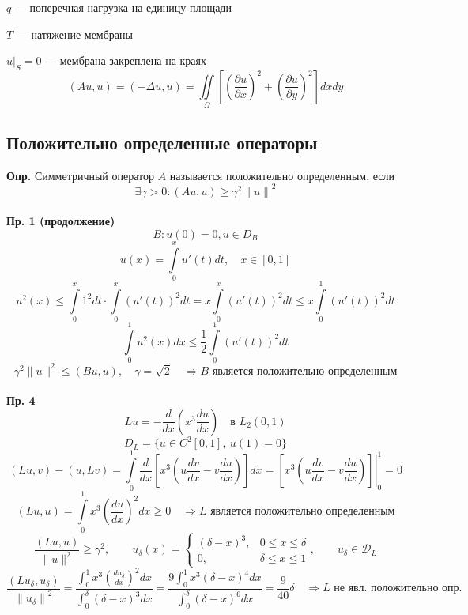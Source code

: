 \documentclass[12pt, a4paper]{article}
\begin{document}
$q$ --- поперечная нагрузка на единицу площади

$T$ --- натяжение мембраны

$ {u|}_S = 0 $ --- мембрана закреплена на краях
\[ (A u , u) = (- \Delta u , u) = \iint\limits_{\Omega} \left[ \left(\frac{\partial u }{\partial x }\right)^2 + \left(\frac{ \partial u }{\partial y }\right)^2 \right] dx dy  \]

\subsection{Положительно определенные операторы}

\textbf{Опр.} Симметричный оператор $A$ называется положительно определенным, если
\begin{equation}
	\exists \gamma > 0 : (Au, u) \geq \gamma^2 {\|u\|}^2
\end{equation} \\
\textbf{Пр. 1 (продолжение)}
\[ B: u(0) = 0, u \in D_B \]
\[ u(x) = \int\limits_{0}^{x } u'(t) dt, \quad x \in [0, 1] \]
\[ u^2(x) \leq \int\limits_{0}^{x} 1^2 dt \cdot \int\limits_{0}^{x} {(u'(t))}^2 dt = x \int\limits_{0}^{x} {(u'(t))}^2 dt \leq x \int\limits_{0}^{1} {(u'(t))}^2 dt \]
\[ \int\limits_{0}^{1} u^2 (x) dx \leq \frac{1}{2} \int\limits_{0}^{1} {(u'(t))}^2 dt \]
\[ \gamma^2 \|u\|^2 \leq (Bu, u) , \quad \gamma = \sqrt{2} \quad \Rightarrow B \text{ является положительно определенным} \] \\
\textbf{Пр. 4}
\[ Lu = - \frac{d }{ d x } \left(x^3 \frac{du}{dx}\right) \quad \text{в } L_2 (0,1) \]
\[ D_L = \{u \in C^2[0,1], \ u(1) = 0 \} \]
\[(Lu, v) - (u, Lv) = \int\limits_{0}^{1} \frac{d}{dx} \left[ x^3 \left(u \frac{dv }{dx } - v \frac{du }{dx } \right)  \right] dx = \left. \left[ x^3 \left(u \frac{dv }{dx } - v \frac{du }{dx } \right) \right] \right|_0^1 = 0\]
\[ (Lu, u) = \int\limits_{0}^{1} x^3 {\left(\frac{du }{dx }\right)}^2 dx \geq 0 \quad \Rightarrow L \text{ является положительно определенным} \]
\[ \frac{(Lu, u)}{\|u\|^2} \geq \gamma^2, \qquad u_\delta (x) = \begin{cases}
	(\delta - x)^3, & 0 \leq x \leq \delta \\
	0, & \delta \leq x \leq 1
\end{cases}, \qquad u_\delta \in \mathcal{D}_L  \]
\[ \frac{(Lu_\delta , u_\delta)}{{\|u_\delta\|}^2}  = \frac{\int_{0}^{1} x^3 {(\frac{du_\delta}{dx})}^2 dx}{\int_{0}^{\delta} {(\delta -x)}^3 dx} = \frac{9 \int_{0}^{1} x^3 {(\delta -x)}^4 dx}{\int_{0}^{\delta} {(\delta -x)}^6 dx} = \frac{9}{40} \delta \quad \Rightarrow L \text{ не явл. положительно опр.} \]
\end{document}
